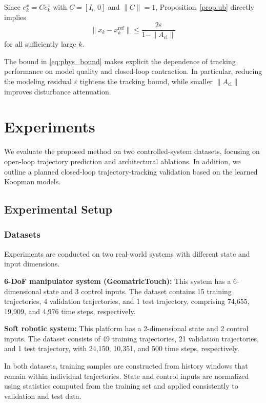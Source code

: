 \documentclass[journal]{IEEEtran}
\begin{document}
Since $e_k^x = C e_k^z$ with $C=[I_n\;0]$ and $\|C\|=1$, Proposition~\ref{prop:ub} directly implies
\begin{equation}
    \|x_k - x_k^{\mathrm{ref}}\|
    \leq
    \frac{2\varepsilon}{1 - \|A_{\mathrm{cl}}\|}
    \label{eq:phys_bound}
\end{equation}
for all sufficiently large $k$.

The bound in \eqref{eq:phys_bound} makes explicit the dependence of tracking performance on model quality and closed-loop contraction. In particular, reducing the modeling residual $\varepsilon$ tightens the tracking bound, while smaller $\|A_{\mathrm{cl}}\|$ improves disturbance attenuation.

\section{Experiments}
\label{sec:experiments}

We evaluate the proposed method on two controlled-system datasets, focusing on open-loop trajectory prediction and architectural ablations. In addition, we outline a planned closed-loop trajectory-tracking validation based on the learned Koopman models.

\subsection{Experimental Setup}

\subsubsection{Datasets}

Experiments are conducted on two real-world systems with different state and input dimensions.

\textbf{6-DoF manipulator system (GeomatricTouch):}  
This system has a 6-dimensional state and 3 control inputs. The dataset contains 15 training trajectories, 4 validation trajectories, and 1 test trajectory, comprising 74,655, 19,909, and 4,976 time steps, respectively.

\textbf{Soft robotic system:}  
This platform has a 2-dimensional state and 2 control inputs. The dataset consists of 49 training trajectories, 21 validation trajectories, and 1 test trajectory, with 24,150, 10,351, and 500 time steps, respectively.

In both datasets, training samples are constructed from history windows that remain within individual trajectories. State and control inputs are normalized using statistics computed from the training set and applied consistently to validation and test data.
\end{document}
